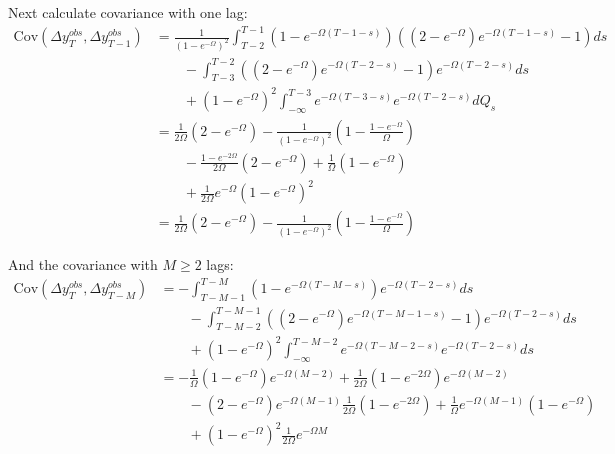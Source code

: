 \documentclass[12pt,pdftex,letterpaper]{article}
\begin{document}
Next calculate covariance with one lag:
\begin{align*}
\mathrm{Cov}(\Delta y_T^{obs},\Delta y_{T-1}^{obs}) 
&=\frac{1}{(1-e^{-\Omega})^2}\int_{T-2}^{T-1}  ( 1 - e^{-\Omega (T-1-s)} ) \left( (2-e^{-\Omega}) e^{-\Omega (T-1-s)} -1  \right) ds \\
& \qquad - \int_{T-3}^{T-2}\left( (2-e^{-\Omega}) e^{-\Omega (T-2-s)} -1  \right) e^{-\Omega (T-2-s)} ds \\
& \qquad +  (1-e^{-\Omega})^2 \int_{-\infty}^{T-3}  e^{-\Omega (T-3-s)}  e^{-\Omega (T-2-s)} dQ_s \\
&=   \frac{1}{2\Omega}(2-e^{-\Omega}) - \frac{1}{(1-e^{-\Omega})^2}( 1 - \frac{1-e^{-\Omega}}{\Omega}) \\
& \qquad - \frac{1-e^{-2\Omega}}{2\Omega}\left( 2- e^{-\Omega} \right) + \frac{1}{\Omega}(1-e^{-\Omega}) \\
& \qquad +  \frac{1 }{2\Omega} e^{-\Omega}(1-e^{-\Omega})^2 \\
&=   \frac{1}{2\Omega}(2-e^{-\Omega}) - \frac{1}{(1-e^{-\Omega})^2}( 1 - \frac{1-e^{-\Omega}}{\Omega})
\end{align*}





And the covariance with $M \geq 2$ lags: 
\begin{align*}
\mathrm{Cov}(\Delta y_T^{obs},\Delta y_{T-M}^{obs}) 
&=-\int_{T-M-1}^{T-M}  ( 1 - e^{-\Omega (T-M-s)} ) e^{-\Omega (T-2-s)} ds \\ 
& \qquad - \int_{T-M-2}^{T-M-1}\left( (2-e^{-\Omega}) e^{-\Omega (T-M-1-s)} -1  \right)e^{-\Omega (T-2-s)} ds \\
& \qquad +  (1-e^{-\Omega})^2 \int_{-\infty}^{T-M-2}  e^{-\Omega (T-M-2-s)} e^{-\Omega (T-2-s)} ds \\
&= -\frac{1}{\Omega}(1-e^{-\Omega})e^{-\Omega (M-2)} +\frac{1}{2\Omega}(1-e^{-2\Omega})e^{-\Omega (M-2)} \\
& \qquad - (2-e^{-\Omega}) e^{-\Omega(M-1)}\frac{1}{2\Omega}(1-e^{-2\Omega}) + \frac{1}{\Omega} e^{-\Omega(M-1)} (1-e^{-\Omega})\\
& \qquad +(1-e^{-\Omega})^2 \frac{1}{2\Omega} e^{-\Omega M} \\
\end{align*}
\end{document}
